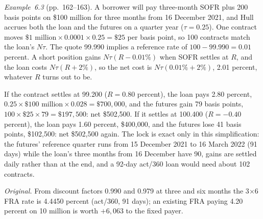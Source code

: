 \begin{qfmethod}
\emph{Example~6.3} (pp.~162--163). A borrower will pay three-month SOFR plus 200 basis points on \$100 million for three months from 16 December 2021, and Hull accrues both the loan and the futures on a quarter year ($\tau=0.25$). One contract moves $\$1\text{ million}\times0.0001\times0.25=\$25$ per basis point, so 100 contracts match the loan's $N\tau$. The quote 99.990 implies a reference rate of $100-99.990=0.01$ percent. A short position gains $N\tau(R-0.01\%)$ when SOFR settles at $R$, and the loan costs $N\tau(R+2\%)$, so the net cost is $N\tau(0.01\%+2\%)$, 2.01 percent, whatever $R$ turns out to be.

If the contract settles at 99.200 ($R=0.80$ percent), the loan pays 2.80 percent, $0.25\times\$100\text{ million}\times0.028=\$700{,}000$, and the futures gain 79 basis points, $100\times\$25\times79=\$197{,}500$: net \$502{,}500. If it settles at 100.400 ($R=-0.40$ percent), the loan pays 1.60 percent, \$400{,}000, and the futures lose 41 basis points, \$102{,}500: net \$502{,}500 again. The lock is exact only in this simplification: the futures' reference quarter runs from 15 December 2021 to 16 March 2022 (91 days) while the loan's three months from 16 December have 90, gains are settled daily rather than at the end, and a 92-day act/360 loan would need about 102 contracts.

\emph{Original.} From discount factors 0.990 and 0.979 at three and six months the 3$\times$6 FRA rate is 4.4450 percent (act/360, 91 days); an existing FRA paying 4.20 percent on 10 million is worth $+6{,}063$ to the fixed payer.


\end{qfmethod}
